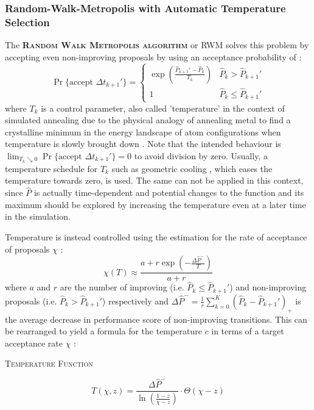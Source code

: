 \documentclass[oneside, a4paper]{book}
\newcommand\emphasis[1]{{\scshape\bfseries#1}}
\newcommand{\equationnamed}[2]{%
  \setlength{\fboxsep}{2pt} %
  \setlength{\fboxrule}{0.01pt}
  \begin{center}
    \begin{minipage}{\textwidth}
      \begin{center}\textsc{#1}\end{center}
      #2
    \end{minipage}
  \end{center}
}
\newcommand\br[1]{\left(#1\right)}
\begin{document}
    \subsubsection{Random-Walk-Metropolis with Automatic Temperature Selection}
    The \emphasis{Random Walk Metropolis algorithm} or RWM solves this problem by accepting even non-improving proposals by using an acceptance probability of \autocite{simulated-annealing}:
    \begin{equation}\label{eq:acceptance-prob}
      \Pr\{\text{accept }\Delta t_{k+1}'\} = \begin{cases}
        \exp\br{\frac{\hat{P}_{k+1}'- \hat{P}_k}{T_k}} 
        &\hat{P}_k>\hat{P}_{k+1}'\\
        1 
        &\hat{P}_k\leq\hat{P}_{k+1}'
      \end{cases}
    \end{equation}
    where $T_k$ is a control parameter, also called 'temperature' in the context of simulated annealing \autocite{simulated-annealing} due to the physical analogy of annealing metal to find a crystalline minimum in the energy landscape of atom configurations when temperature is slowly brought down \autocite{simulated-annealing}. Note that the intended behaviour is $\lim_{T_k\searrow 0} \Pr\{\text{accept }\Delta t_{k+1}'\}=0$ to avoid division by zero. Usually, a temperature schedule for $T_k$ such as geometric cooling \autocite{simulated-annealing}, which eases the temperature towards zero, is used. The same can not be applied in this context, since $\hat{P}$ is actually time-dependent and potential changes to the function and its maximum should be explored by increasing the temperature even at a later time in the simulation.
    
    Temperature is instead controlled using the estimation for the rate of acceptance of proposals $\chi$ \autocite{simulated-annealing}:
    \begin{equation}
      \chi\br{T} \approx \frac{a+r \exp\br{-\frac{\Delta\hat{P}^-}{T}}}{a+r}
    \end{equation}
    where $a$ and $r$ are the number of improving (i.e. $\hat{P}_k\leq\hat{P}_{k+1}'$) and non-improving proposals (i.e. $\hat{P}_k>\hat{P}_{k+1}'$) respectively and $\Delta \hat{P}^- = \frac{1}{r}\sum_{k=0}^K \br{\hat{P}_k - \hat{P}_{k+1}'}_+$ is the average decrease in performance score of non-improving transitions. This can be rearranged to yield a formula for the temperature $c$ in terms of a target acceptance rate $\chi$ \autocite{simulated-annealing}:
    \equationnamed{Temperature Function}{
      \begin{equation}\label{eq:c-from-chi}
        T\br{\chi,z} 
        = \frac{\Delta \hat{P}^-}{\ln\br{\frac{1-z}{\chi-z}}} \cdot \Theta\br{\chi-z}
      \end{equation}
    }
    
\end{document}
